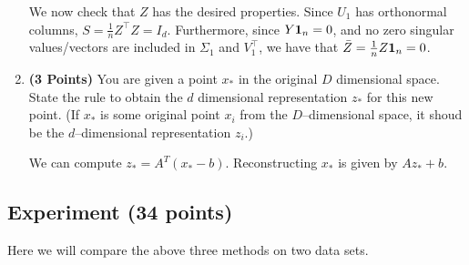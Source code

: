 \documentclass[a4paper]{article}
\newcommand*{\one}{{\bf 1}}
\newcommand{\Zbar}{\bar{Z}}
\theoremstyle{definition}
\newenvironment{soln}{
    \leavevmode\color{blue}\ignorespaces
}{}
\begin{document}
\begin{enumerate}
\begin{soln}
          We now check that $Z$ has the desired properties. Since $U_{1}$ has orthonormal columns, $S=\frac{1}{n}Z^{\top}Z=I_{d}$. Furthermore, since $Y\one_{n}=0$, and no zero singular values/vectors are included in $\Sigma_{1}$ and $V_{1}^{\top}$, we have that $\Zbar=\frac{1}{n}Z\one_{n}=0$.
        \end{soln}

\item \textbf{(3 Points)}
You are given a point $x_*$ in the original $D$ dimensional space.
State the rule to obtain the $d$ dimensional
representation $z_*$ for this new point.
(If $x_*$ is some original point $x_i$ from the $D$--dimensional space, it shoud be the
$d$--dimensional representation $z_i$.)

\begin{soln}
 We can compute $z_{*} = A^{T}(x_{*}-b)$. Reconstructing $x_{*}$ is given by $Az_{*}+b$.
\end{soln}

\end{enumerate}


\subsection{Experiment (34 points)}

Here we will compare the above three methods on two data sets.
\end{document}
